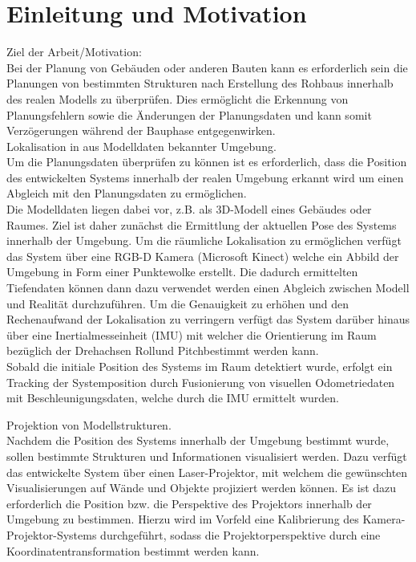 \chapter{Einleitung und Motivation}

Ziel der Arbeit/Motivation:\\
Bei der Planung von Gebäuden oder anderen Bauten kann es erforderlich sein die Planungen von bestimmten Strukturen nach Erstellung des Rohbaus innerhalb des realen Modells zu überprüfen. Dies ermöglicht die Erkennung von Planungsfehlern sowie die Änderungen der Planungsdaten und kann somit Verzögerungen während der Bauphase entgegenwirken.\\

Lokalisation in aus Modelldaten bekannter Umgebung.\\
Um die Planungsdaten überprüfen zu können ist es erforderlich, dass die Position des entwickelten Systems innerhalb der realen Umgebung erkannt wird um einen Abgleich mit den Planungsdaten zu ermöglichen.\\
Die Modelldaten liegen dabei vor, z.B. als 3D-Modell eines Gebäudes oder Raumes. Ziel ist daher zunächst die Ermittlung der aktuellen Pose des Systems innerhalb der Umgebung. Um die räumliche Lokalisation zu ermöglichen verfügt das System über eine RGB-D Kamera (Microsoft Kinect) welche ein Abbild der Umgebung in Form einer Punktewolke erstellt. Die dadurch ermittelten Tiefendaten können dann dazu verwendet werden einen Abgleich zwischen Modell und Realität durchzuführen. Um die Genauigkeit zu erhöhen und den Rechenaufwand der Lokalisation zu verringern verfügt das System darüber hinaus über eine Inertialmesseinheit (IMU) mit welcher die Orientierung im Raum bezüglich der Drehachsen \glqq Roll\grqq\space und \glqq Pitch\grqq\space bestimmt werden kann.\\
Sobald die initiale Position des Systems im Raum detektiert wurde, erfolgt ein Tracking der Systemposition durch Fusionierung von visuellen Odometriedaten mit Beschleunigungsdaten, welche durch die IMU ermittelt wurden.

Projektion von Modellstrukturen.\\
Nachdem die Position des Systems innerhalb der Umgebung bestimmt wurde, sollen bestimmte Strukturen und Informationen visualisiert werden. Dazu verfügt das entwickelte System über einen Laser-Projektor, mit welchem die gewünschten Visualisierungen auf Wände und Objekte projiziert werden können. Es ist dazu erforderlich die Position bzw. die Perspektive des Projektors innerhalb der Umgebung zu bestimmen. Hierzu wird im Vorfeld eine Kalibrierung des Kamera-Projektor-Systems durchgeführt, sodass die Projektorperspektive durch eine Koordinatentransformation bestimmt werden kann.

